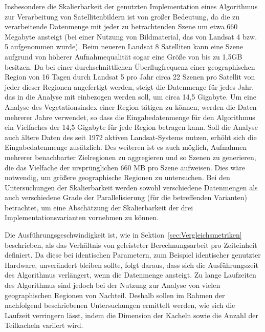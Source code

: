 Insbesondere die Skalierbarkeit der genutzten Implementation eines Algorithmus zur Verarbeitung von Satellitenbildern ist von großer Bedeutung, da die zu verarbeitende Datenmenge mit jeder zu betrachtenden Szene um etwa 660 Megabyte ansteigt (bei einer Nutzung von Bildmaterial, das von Landsat 4 bzw. 5 aufgenommen wurde). Beim neueren Landsat 8 Satelliten kann eine Szene aufgrund von höherer Aufnahmequalität sogar eine Größe von bis zu 1,5GB besitzen. Da bei einer durchschnittlichen Überflugfrequenz einer geographischen Region von 16 Tagen durch Landsat 5 pro Jahr circa 22 Szenen pro Satellit von jeder dieser Regionen angefertigt werden, steigt die Datenmenge für jedes Jahr, das in die Analyse mit einbezogen werden soll, um circa 14,5 Gigabyte. Um eine Analyse des Vegetationsindex einer Region tätigen zu können, werden die Daten mehrerer Jahre verwendet, so dass die Eingabedatenmenge für den Algorithmus ein Vielfaches der 14,5 Gigabyte für jede Region betragen kann. Soll die Analyse auch ältere Daten des seit 1972 aktiven Landsat-Systems nutzen, erhöht sich die Eingabedatenmenge zusätzlich. Des weiteren ist es auch möglich, Aufnahmen mehrerer benachbarter Zielregionen zu aggregieren und so Szenen zu generieren, die das Vielfache der ursprünglichen 660 MB pro Szene aufweisen. Dies wäre notwendig, um größere geographische Regionen zu untersuchen. 
Bei den Untersuchungen der Skalierbarkeit werden sowohl verschiedene Datenmengen als auch verschiedene Grade der Parallelisierung (für die betreffenden Varianten) betrachtet, um eine Abschätzung der Skalierbarkeit der drei Implementationsvarianten vornehmen zu können.

Die Ausführungsgeschwindigkeit ist, wie in Sektion~\ref{sec:Vergleichsmetriken} beschrieben, als das Verhältnis von geleisteter Berechnungsarbeit pro Zeiteinheit definiert. Da diese bei identischen Parametern, zum Beispiel identischer genutzter Hardware, unverändert bleiben sollte, folgt daraus, dass sich die Ausführungszeit des Algorithmus verlängert, wenn die Datenmenge ansteigt. Zu lange Laufzeiten des Algorithmus sind jedoch bei der Nutzung zur Analyse von vielen geographischen Regionen von Nachteil. Deshalb sollen im Rahmen der nachfolgend beschriebenen Untersuchungen ermittelt werden, wie sich die Laufzeit verringern lässt, indem die Dimension der Kacheln sowie die Anzahl der Teilkacheln variiert wird. 

